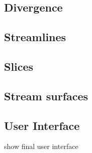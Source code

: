 
\subsection{Divergence}
\subsection{Streamlines}
\subsection{Slices}
\subsection{Stream surfaces}
\subsection{User Interface}
show final user interface
